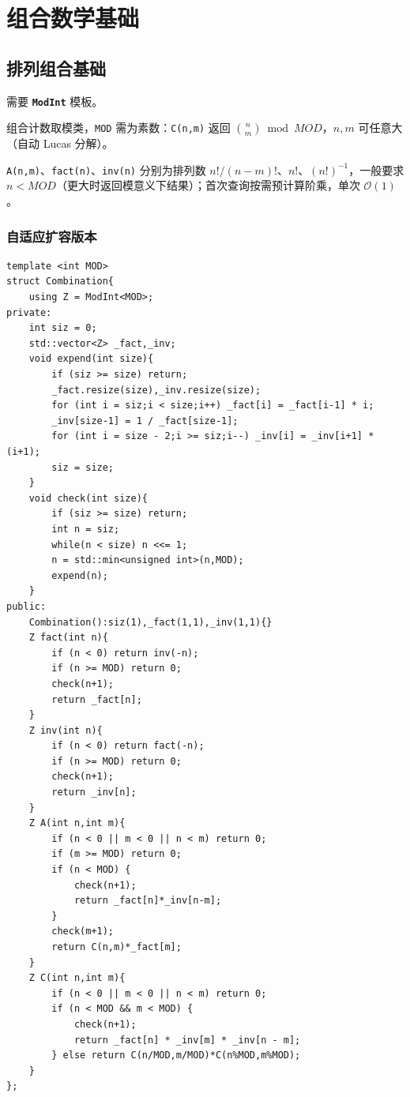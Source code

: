 \section{组合数学基础}

\subsection{排列组合基础}

需要 \textbf{\texttt{ModInt}} 模板。

组合计数取模类，\texttt{MOD} 需为素数：\texttt{C(n,m)} 返回 $\binom{n}{m}\bmod MOD$，$n,m$ 可任意大（自动 Lucas 分解）。

\texttt{A(n,m)}、\texttt{fact(n)}、\texttt{inv(n)} 分别为排列数 $n!/(n-m)!$、$n!$、$(n!)^{-1}$，一般要求 $n<MOD$（更大时返回模意义下结果）；首次查询按需预计算阶乘，单次 $\mathcal{O}(1)$。

\subsubsection{自适应扩容版本}

\begin{lstlisting}
template <int MOD>
struct Combination{
    using Z = ModInt<MOD>;
private:
    int siz = 0;
    std::vector<Z> _fact,_inv;
    void expend(int size){
        if (siz >= size) return;
        _fact.resize(size),_inv.resize(size);
        for (int i = siz;i < size;i++) _fact[i] = _fact[i-1] * i;
        _inv[size-1] = 1 / _fact[size-1];
        for (int i = size - 2;i >= siz;i--) _inv[i] = _inv[i+1] * (i+1);
        siz = size;
    }
    void check(int size){
        if (siz >= size) return;
        int n = siz;
        while(n < size) n <<= 1;
        n = std::min<unsigned int>(n,MOD);
        expend(n);
    }
public:
    Combination():siz(1),_fact(1,1),_inv(1,1){}
    Z fact(int n){
        if (n < 0) return inv(-n);
        if (n >= MOD) return 0;
        check(n+1);
        return _fact[n];
    }
    Z inv(int n){
        if (n < 0) return fact(-n);
        if (n >= MOD) return 0;
        check(n+1);
        return _inv[n];
    }
    Z A(int n,int m){
        if (n < 0 || m < 0 || n < m) return 0;
        if (m >= MOD) return 0;
        if (n < MOD) {
            check(n+1);
            return _fact[n]*_inv[n-m];
        }
        check(m+1);
        return C(n,m)*_fact[m];
    }
    Z C(int n,int m){
        if (n < 0 || m < 0 || n < m) return 0;
        if (n < MOD && m < MOD) {
            check(n+1);
            return _fact[n] * _inv[m] * _inv[n - m];
        } else return C(n/MOD,m/MOD)*C(n%MOD,m%MOD);
    }
};
\end{lstlisting}

